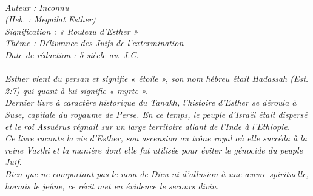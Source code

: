 \BFont
\noindent\hrulefill
{\footnotesize
\textit{
\bigskip
{\centering{}
\\Auteur : Inconnu
\\(Heb. : Meguilat Esther)
\\Signification : « Rouleau d'Esther »
\\Thème : Délivrance des Juifs de l'extermination
\\Date de rédaction : 5 siècle av. J.C.\\}
}
\textit{
\\Esther vient du persan et signifie « étoile », son nom hébreu était Hadassah (Est. 2:7) qui quant à lui signifie « myrte ».
\\Dernier livre à caractère historique du Tanakh, l'histoire d'Esther se déroula à Suse, capitale du royaume de Perse. En ce temps, le peuple d'Israël était dispersé et le roi Assuérus régnait sur un large territoire allant de l'Inde à l'Ethiopie.
\\Ce livre raconte la vie d'Esther, son ascension au trône royal où elle succéda à la reine Vasthi et la manière dont elle fut utilisée pour éviter le génocide du peuple Juif. 
\\Bien que ne comportant pas le nom de Dieu ni d'allusion à une œuvre spirituelle, hormis le jeûne, ce récit met en évidence le secours divin.\bigskip
}
}
\par\nobreak\noindent\hrulefill
